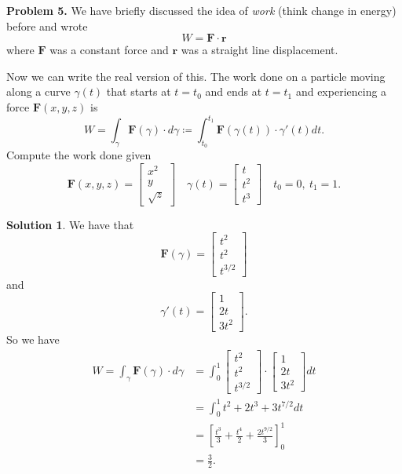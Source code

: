 \documentclass[12pt]{report} %
\theoremstyle{definition}
\newtheorem{solution}{Solution}
\begin{document}
\noindent\textbf{Problem 5.} We have briefly discussed the idea of \emph{work} (think change in energy) before and wrote
\[
W=\mathbf{F}\cdot \mathbf{r}
\]
where $\mathbf{F}$ was a constant force and $\mathbf{r}$ was a straight line displacement.

Now we can write the real version of this.  The work done on a particle moving along a curve $\gamma(t)$ that starts at $t=t_0$ and ends at $t=t_1$ and experiencing a force $\mathbf{F}(x,y,z)$ is
\[
W=\int_\gamma \mathbf{F}(\gamma)\cdot d\gamma \coloneqq \int_{t_0}^{t_1} \mathbf{F}(\gamma(t))\cdot \gamma'(t) dt.
\]
Compute the work done given
\[
\mathbf{F}(x,y,z)=\begin{bmatrix} x^2\\ y\\ \sqrt{z}\end{bmatrix} \quad \gamma(t)=\begin{bmatrix} t\\ t^2\\t^3 \end{bmatrix} \quad t_0=0, ~ t_1=1.
\]

\begin{solution}
We have that
\[
\mathbf{F}(\gamma) = \begin{bmatrix} t^2 \\ t^2 \\ t^{3/2} \end{bmatrix}
\]
and
\[
\gamma'(t) = \begin{bmatrix} 1 \\ 2t \\ 3t^2 \end{bmatrix}.
\]
So we have
\begin{align*}
    W = \int_\gamma \mathbf{F}(\gamma)\cdot d\gamma &= \int_0^1 \begin{bmatrix} t^2 \\ t^2 \\ t^{3/2} \end{bmatrix} \cdot \begin{bmatrix} 1 \\ 2t\\ 3t^2 \end{bmatrix} dt\\
    &= \int_0^1 t^2 +2t^3+3t^{7/2}dt\\
    &= \left[ \frac{t^3}{3} + \frac{t^4}{2}+\frac{2t^{9/2}}{3}\right]_0^1\\
    &= \frac{3}{2}.
\end{align*}
\end{solution}
\end{document}
